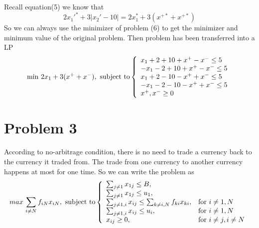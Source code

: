 \documentclass{article}
\begin{document}
Recall equation(5) we know that
\begin{equation}  
2x_1'^*+3|x_2'-10| = 2x_1^*+3(x^{+*}+x^{+*})
\end{equation}  
So we can always use the minimizer of problem (6) to get the minimizer and minimum value of the original problem. Then problem has been transferred into a LP
\begin{equation}  
\min \,2x_1+3(x^++x^-) , \textnormal{ subject to}
\left\{  
             \begin{array}{ll}
             x_1+2+10+x^+-x^-\leq 5\\
             -x_1-2+10+x^+-x^-\leq 5\\
             x_1+2-10-x^++x^-\leq 5\\
             -x_1-2-10-x^++x^-\leq 5\\
             x^+,x^-\geq 0
             \end{array}  
\right.  
\end{equation}  

\section*{Problem 3}
According to no-arbitrage condition, there is no need to trade a currency back to the currency it traded from. The trade from one currency to another currency happens at most for one time. So we can write the problem as 
\begin{equation}  
max \,\sum_{i \not= N} f_{iN} x_{iN}, \text{ subject to}
\left\{  
             \begin{array}{ll}
             \sum_{j\not= 1}x_{1j}\leq B,\\
             \sum_{j\not= 1}x_{1j}\leq u_1,\\
             \sum_{j\not= 1, i}x_{ij}\leq \sum_{k\not=i,N}f_{ki} x_{ki},& \textnormal{for~} i\not= 1,N\\
             \sum_{j\not= 1, i}x_{ij}\leq u_i,& \textnormal{for~} i\not= 1,N\\
             x_{ij}\geq 0, & \textnormal{for~} i\not= j,i\not=N
             \end{array}  
\right.  
\end{equation}  
\end{document}
